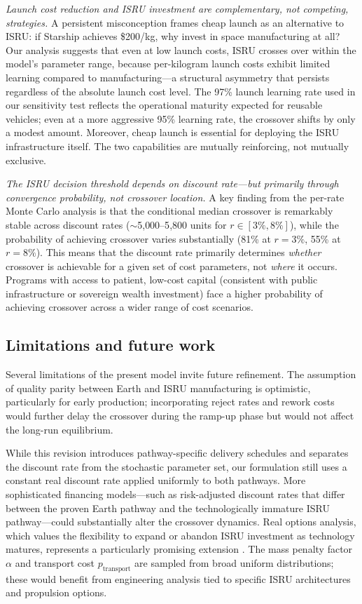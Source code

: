 \documentclass[preprint,12pt]{elsarticle}
\begin{document}
\emph{Launch cost reduction and ISRU investment are complementary, not competing, strategies.} A persistent misconception frames cheap launch as an alternative to ISRU: if Starship achieves \$200/kg, why invest in space manufacturing at all? Our analysis suggests that even at low launch costs, ISRU crosses over within the model's parameter range, because per-kilogram launch costs exhibit limited learning compared to manufacturing---a structural asymmetry that persists regardless of the absolute launch cost level. The 97\% launch learning rate used in our sensitivity test reflects the operational maturity expected for reusable vehicles; even at a more aggressive 95\% learning rate, the crossover shifts by only a modest amount. Moreover, cheap launch is essential for deploying the ISRU infrastructure itself. The two capabilities are mutually reinforcing, not mutually exclusive.

\emph{The ISRU decision threshold depends on discount rate---but primarily through convergence probability, not crossover location.} A key finding from the per-rate Monte Carlo analysis is that the conditional median crossover is remarkably stable across discount rates ($\sim$5{,}000--5{,}800 units for $r \in [3\%, 8\%]$), while the probability of achieving crossover varies substantially (81\% at $r = 3\%$, 55\% at $r = 8\%$). This means that the discount rate primarily determines \emph{whether} crossover is achievable for a given set of cost parameters, not \emph{where} it occurs. Programs with access to patient, low-cost capital (consistent with public infrastructure or sovereign wealth investment) face a higher probability of achieving crossover across a wider range of cost scenarios.

\subsection{Limitations and future work}

Several limitations of the present model invite future refinement. The assumption of quality parity between Earth and ISRU manufacturing is optimistic, particularly for early production; incorporating reject rates and rework costs would further delay the crossover during the ramp-up phase but would not affect the long-run equilibrium.

While this revision introduces pathway-specific delivery schedules and separates the discount rate from the stochastic parameter set, our formulation still uses a constant real discount rate applied uniformly to both pathways. More sophisticated financing models---such as risk-adjusted discount rates that differ between the proven Earth pathway and the technologically immature ISRU pathway---could substantially alter the crossover dynamics. Real options analysis, which values the flexibility to expand or abandon ISRU investment as technology matures, represents a particularly promising extension \cite{sowers2021}. The mass penalty factor $\alpha$ and transport cost $p_{\mathrm{transport}}$ are sampled from broad uniform distributions; these would benefit from engineering analysis tied to specific ISRU architectures and propulsion options.
\end{document}
